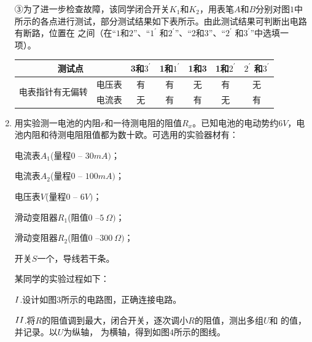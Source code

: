 \begin{enumerate}[leftmargin=0em]
③为了进一步检查故障，该同学闭合开关$ K_{1} $和$ K_{2} $，用表笔$ A $和$ B $分别对图$ 1 $中所示的各点进行测试，部分测试结果如下表所示。由此测试结果可判断出电路有断路，位置在  之间（在“$ 1 $和$ 2 $”、“$ 1 ^{\prime} $ 和$ 2 ^{\prime} $”、“$ 2 $和$ 3 $”、“$ 2 ^{\prime} $ 和$ 3 ^{\prime} $”中选填一项）。




\begin{table}[h!]
\centering 
\begin{tabular}{|c|c|c|c|c|c|c|}
\hline 
\multicolumn{2}{|c|}{测试点} &3和$ 3 ^{\prime} $ & 1和$ 1 ^{\prime} $ & 1和3 & 1和$ 2 ^{\prime} $ &$ 2 ^{\prime} $ 和$ 3 ^{\prime} $ \\
\hline
\multirow{2}{4em}{电表指针有无偏转} & 电压表 & 有 & 有 & 无 & 有 & 无
 \\
\hline
& 电流表 & 无 & 有 & 有 & 无 & 有\\ 
\hline 
\end{tabular}
\end{table} 




\newpage
\item
{}
用实验测一电池的内阻$ r $和一待测电阻的阻值$ R_x $。已知电池的电动势约$ 6V $，电池内阻和待测电阻阻值都为数十欧。可选用的实验器材有：

电流表$ A_{1} $(量程$ 0 $ – $ 30mA) $；

电流表$ A_{2} $(量程$ 0 $ – $ 100mA) $；

电压表$ V $(量程$ 0 $ – $ 6V) $；

滑动变阻器$ R_{1} $(阻值$ 0 $ –$ 5 \ \Omega ) $；

滑动变阻器$ R_{2} $(阻值$ 0 $ –$ 300 \ \Omega ) $；

开关$ S $一个，导线若干条。
\begin{figure}[h!]
\centering
 \qquad 

\end{figure}

某同学的实验过程如下：

$ \lmd{1} $.设计如图$ 3 $所示的电路图，正确连接电路。

$ \lmd{2} $.将$ R $的阻值调到最大，闭合开关，逐次调小$ R $的阻值，测出多组$ U $和  的值，并记录。以$ U $为纵轴，  为横轴，得到如图$ 4 $所示的图线。


\end{enumerate}
